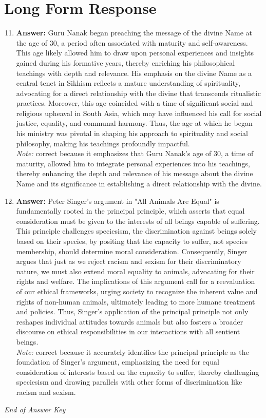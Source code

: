 \documentclass[12pt]{article}
\begin{document}
\section*{Long Form Response}
\begin{enumerate}[label=\arabic*.]
\setcounter{enumi}{10}
\item \textbf{Answer:} Guru Nanak began preaching the message of the divine Name at the age of 30, a period often associated with maturity and self-awareness. This age likely allowed him to draw upon personal experiences and insights gained during his formative years, thereby enriching his philosophical teachings with depth and relevance. His emphasis on the divine Name as a central tenet in Sikhism reflects a mature understanding of spirituality, advocating for a direct relationship with the divine that transcends ritualistic practices. Moreover, this age coincided with a time of significant social and religious upheaval in South Asia, which may have influenced his call for social justice, equality, and communal harmony. Thus, the age at which he began his ministry was pivotal in shaping his approach to spirituality and social philosophy, making his teachings profoundly impactful.
\\ \textit{Note:} correct because it emphasizes that Guru Nanak's age of 30, a time of maturity, allowed him to integrate personal experiences into his teachings, thereby enhancing the depth and relevance of his message about the divine Name and its significance in establishing a direct relationship with the divine.
\item \textbf{Answer:} Peter Singer's argument in "All Animals Are Equal" is fundamentally rooted in the principal principle, which asserts that equal consideration must be given to the interests of all beings capable of suffering. This principle challenges speciesism, the discrimination against beings solely based on their species, by positing that the capacity to suffer, not species membership, should determine moral consideration. Consequently, Singer argues that just as we reject racism and sexism for their discriminatory nature, we must also extend moral equality to animals, advocating for their rights and welfare. The implications of this argument call for a reevaluation of our ethical frameworks, urging society to recognize the inherent value and rights of non-human animals, ultimately leading to more humane treatment and policies. Thus, Singer's application of the principal principle not only reshapes individual attitudes towards animals but also fosters a broader discourse on ethical responsibilities in our interactions with all sentient beings.
\\ \textit{Note:} correct because it accurately identifies the principal principle as the foundation of Singer's argument, emphasizing the need for equal consideration of interests based on the capacity to suffer, thereby challenging speciesism and drawing parallels with other forms of discrimination like racism and sexism.
\end{enumerate}

\vfill
\noindent\textit{End of Answer Key}
\end{document}
